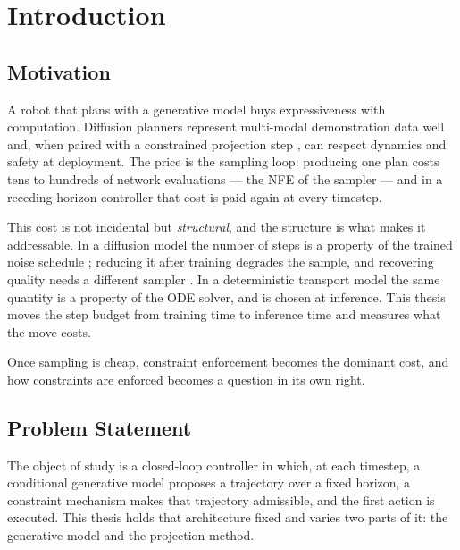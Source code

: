 \documentclass[headsepline,footsepline,footinclude=false,oneside,fontsize=11pt,paper=a4,listof=totoc,bibliography=totoc]{scrbook}
\theoremstyle{definition}
\theoremstyle{plain}
\theoremstyle{remark}
\begin{document}
\tableofcontents{}

\mainmatter{}

\chapter{Introduction}\label{ch:introduction}

\section{Motivation}\label{sec:intro:motivation}

A robot that plans with a generative model buys expressiveness with computation. Diffusion
planners \parencite{janner2022planning,chi2023diffusion} represent multi-modal demonstration data
\parencite{jia2024towards} well and, when paired with a constrained projection step
\parencite{romer2025diffusion}, can respect dynamics and safety at deployment. The price is the sampling
loop: producing one plan costs tens to hundreds of network evaluations --- the \ac{NFE} of the
sampler --- and in a receding-horizon controller that cost is paid again at every timestep.

This cost is not incidental but \emph{structural}, and the structure is what makes it
addressable. In a diffusion model the number of steps is a
property of the trained noise schedule \parencite{ho2020denoising}; reducing it after training
degrades the sample, and recovering quality needs a different sampler
\parencite{song2021denoising}. In a deterministic transport model \parencite{lipman2023flow} the same
quantity is a property of the \ac{ODE} solver, and is chosen at inference. This thesis moves the
step budget from training time to inference time and measures what the move costs.

Once sampling is cheap, constraint enforcement becomes the dominant cost, and how constraints are
enforced becomes a question in its own right.

\section{Problem Statement}\label{sec:intro:problem}

The object of study is a closed-loop controller in which, at each timestep, a conditional
generative model proposes a trajectory over a fixed horizon, a constraint mechanism makes
that trajectory admissible, and the first action is executed. This thesis holds that
architecture fixed and varies two parts of it: the generative model and the projection method.
\end{document}
